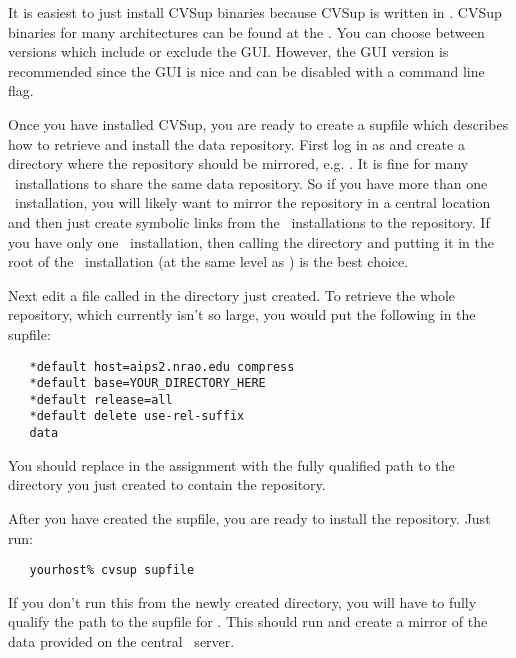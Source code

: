 It is easiest to just install CVSup binaries because CVSup is written in
.
CVSup binaries for many architectures can be found at the
.
You can choose between versions which include or exclude the GUI. However, the GUI
version is recommended since the GUI is nice and can be disabled with a command
line flag.

Once you have installed CVSup, you are ready to create a supfile which describes
how to retrieve and install the data repository. First log in as 
and create a directory where the repository should be mirrored, e.g. .
It is fine for many \aipspp\ installations to share the same data repository. So if
you have more than one \aipspp\ installation, you will likely want to mirror the
repository in a central location and then just create symbolic links from the
\aipspp\ installations to the repository. If you have only one \aipspp\ installation,
then calling the directory  and putting it in the root of the
\aipspp\ installation (at the same level as ) is the best choice.

Next edit a file called  in the directory just created. To retrieve the whole
repository, which currently isn't so large, you would put the following in the supfile:

\begin{verbatim}
   *default host=aips2.nrao.edu compress
   *default base=YOUR_DIRECTORY_HERE
   *default release=all
   *default delete use-rel-suffix
   data
\end{verbatim}

\noindent
You should replace  in the  assignment with
the fully qualified path to the directory you just created to contain the repository.

After you have created the supfile, you are ready to install the repository. Just
run:

\begin{verbatim}
   yourhost% cvsup supfile
\end{verbatim}

\noindent
If you don't run this from the newly created directory, you will
have to fully qualify the path to the supfile for . This should run
and create a mirror of the data provided on the central \aipspp\ server.

